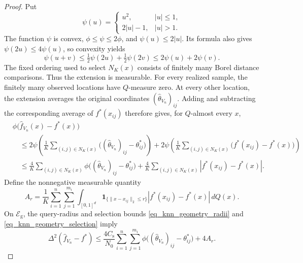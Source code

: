 \documentclass[twoside,11pt]{article}
\newenvironment{revision}{\color{revisionred}}{}
\begin{document}
\begin{revision}
\begin{proof}
Put
\[
\psi(u)=
\begin{cases}
u^2,& |u|\leq1,\\
2|u|-1,& |u|>1.
\end{cases}
\]
The function $\psi$ is convex,
$\phi\leq\psi\leq2\phi$, and $\psi(u)\leq2|u|$.
Its formula also gives $\psi(2u)\leq4\psi(u)$, so convexity yields
\[
\psi(u+v)
\leq\tfrac12\psi(2u)+\tfrac12\psi(2v)
\leq2\psi(u)+2\psi(v).
\]
The fixed ordering used to select $N_K(x)$ consists of finitely
many Borel distance comparisons. Thus the extension is measurable.
For every realized sample, the finitely many observed locations
have $Q$-measure zero. At every other location, the extension
averages the original coordinates $(\hat\theta_{V_n})_{ij}$.
Adding and subtracting the corresponding average of
$f^*(x_{ij})$ therefore gives, for $Q$-almost every $x$,
\begin{align*}
&\phi\bigl(\hat f_{V_n}(x)-f^*(x)\bigr)\\
&\quad\leq
2\psi\left(
\frac1K\sum_{(i,j)\in N_K(x)}
\bigl((\hat\theta_{V_n})_{ij}-\theta^*_{ij}\bigr)
\right)
+2\psi\left(
\frac1K\sum_{(i,j)\in N_K(x)}
\bigl(f^*(x_{ij})-f^*(x)\bigr)
\right)\\
&\quad\leq
\frac4K\sum_{(i,j)\in N_K(x)}
\phi\bigl((\hat\theta_{V_n})_{ij}-\theta^*_{ij}\bigr)
+\frac4K\sum_{(i,j)\in N_K(x)}
|f^*(x_{ij})-f^*(x)|.
\end{align*}
Define the nonnegative measurable quantity
\[
A_r=\frac1K\sum_{i=1}^n\sum_{j=1}^{m_i}
\int_{[0,1]^d}
\mathbf1_{\{\|x-x_{ij}\|_2\leq r\}}
|f^*(x_{ij})-f^*(x)|\,dQ(x).
\]
On $\mathcal E_{\mathrm g}$, the query-radius and selection
bounds \eqref{eq_knn_geometry_radii} and
\eqref{eq_knn_geometry_selection} imply
\begin{equation}
\label{eq_knn_extension_transfer}
\Delta^2(\hat f_{V_n}-f^*)
\leq
\frac{4C_{\mathrm s}}{N_0}\sum_{i=1}^n\sum_{j=1}^{m_i}
\phi\bigl((\hat\theta_{V_n})_{ij}-\theta^*_{ij}\bigr)
+4A_r.
\end{equation}


\end{proof}
\end{revision}
\end{document}
